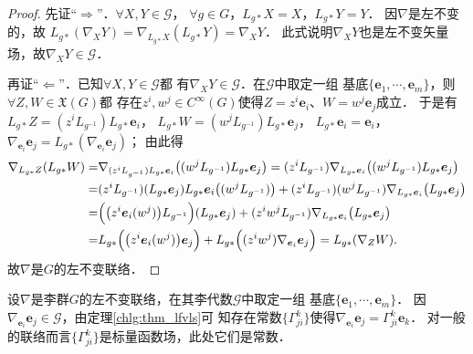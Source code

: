 \begin{proof}
    先证“$\Rightarrow$”．$\forall X,Y \in \mathscr{G}$，
    $\forall g\in G$，$L_{g*} X = X$，$L_{g*} Y = Y$．
    因$\nabla$是左不变的，故
    $    L_{g*}(\nabla_X Y) = \nabla_{L_{g*}X}(L_{g*}Y) = \nabla_{X}Y $．
    此式说明$\nabla_X Y$也是左不变矢量场，故$\nabla_X Y\in \mathscr{G}$．
    
    再证“$\Leftarrow$”．已知$\forall X,Y \in \mathscr{G}$都
    有$\nabla_X Y\in \mathscr{G}$．在$\mathscr{G}$中取定一组
    基底$\{\boldsymbol{e}_1,\cdots,\boldsymbol{e}_m\}$，则$\forall Z,W\in \mathfrak{X}(G)$都
    存在$z^i,w^j\in C^\infty(G)$使得$Z=z^i \boldsymbol{e}_i$、$W=w^j \boldsymbol{e}_j$成立．    于是有
    $L_{g*}Z = (z^i L_{g^{-1}}) L_{g*} \boldsymbol{e}_i$，
    $L_{g*}W = (w^j L_{g^{-1}}) L_{g*} \boldsymbol{e}_j$，
    $L_{g*}\boldsymbol{e}_i = \boldsymbol{e}_i$，
    $\nabla_{\boldsymbol{e}_i} \boldsymbol{e}_j = L_{g*}(\nabla_{\boldsymbol{e}_i} \boldsymbol{e}_j)$；
    由此得 \setlength{\mathindent}{0em}
    \begin{align*}
        \nabla_{L_{g*}Z} (L_{g*}W)= & \nabla_{(z^i L_{g^{-1}}) L_{g*} \boldsymbol{e}_i }
        \bigl( (w^j L_{g^{-1}}) L_{g*} \boldsymbol{e}_j \bigr)
        =(z^i L_{g^{-1}}) \nabla_{ L_{g*} \boldsymbol{e}_i }\bigl( (w^j L_{g^{-1}}) L_{g*} \boldsymbol{e}_j \bigr) \\
        =&(z^i L_{g^{-1}}) (L_{g*} \boldsymbol{e}_j) L_{g*} \boldsymbol{e}_i \bigl( (w^j L_{g^{-1}})  \bigr)
        + (z^i L_{g^{-1}}) (w^j L_{g^{-1}})  \nabla_{ L_{g*} \boldsymbol{e}_i }\bigl( L_{g*} \boldsymbol{e}_j \bigr) \\
        =& \Bigl( \bigl(z^i \boldsymbol{e}_i(w^j) \bigr)L_{g^{-1}}\Bigr) (L_{g*} \boldsymbol{e}_j)
        + (z^i w^j L_{g^{-1}}) \nabla_{ L_{g*} \boldsymbol{e}_i }\bigl( L_{g*} \boldsymbol{e}_j \bigr)  \\
        =& L_{g*}\Bigl( \bigl(z^i \boldsymbol{e}_i(w^j) \bigr) \boldsymbol{e}_j \Bigr)
        +L_{g*}\Bigl( (z^i w^j ) \nabla_{\boldsymbol{e}_i} \boldsymbol{e}_j\Bigr)
        =L_{g*} (\nabla_Z W ) .
    \end{align*}\setlength{\mathindent}{2em}
    故$\nabla$是$G$的左不变联络．
\end{proof}


设$\nabla$是李群$G$的左不变联络，在其李代数$\mathscr{G}$中取定一组
基底$\{\boldsymbol{e}_1,\cdots,\boldsymbol{e}_m\}$．
因$\nabla_{\boldsymbol{e}_i} \boldsymbol{e}_j \in \mathscr{G}$，由定理\ref{chlg:thm_lfvls}可
知存在{\kaishu 常数}$\{\Gamma^k_{ji}\}$使得$\nabla_{\boldsymbol{e}_i} \boldsymbol{e}_j= \Gamma^k_{ji} \boldsymbol{e}_k$．
对一般的联络而言$\{\Gamma^k_{ji}\}$是标量函数场，此处它们是{\kaishu 常数}．

